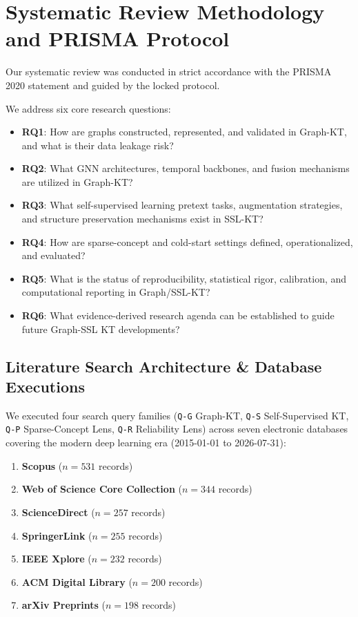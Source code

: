 ﻿\documentclass[10pt,journal,compsoc]{IEEEtran}
\begin{document}
\section{Systematic Review Methodology and PRISMA Protocol}
Our systematic review was conducted in strict accordance with the PRISMA 2020 statement and guided by the locked protocol.

We address six core research questions:
\begin{itemize}
    \item \textbf{RQ1}: How are graphs constructed, represented, and validated in Graph-KT, and what is their data leakage risk?
    \item \textbf{RQ2}: What GNN architectures, temporal backbones, and fusion mechanisms are utilized in Graph-KT?
    \item \textbf{RQ3}: What self-supervised learning pretext tasks, augmentation strategies, and structure preservation mechanisms exist in SSL-KT?
    \item \textbf{RQ4}: How are sparse-concept and cold-start settings defined, operationalized, and evaluated?
    \item \textbf{RQ5}: What is the status of reproducibility, statistical rigor, calibration, and computational reporting in Graph/SSL-KT?
    \item \textbf{RQ6}: What evidence-derived research agenda can be established to guide future Graph-SSL KT developments?
\end{itemize}

\subsection{Literature Search Architecture \& Database Executions}
We executed four search query families (\texttt{Q-G} Graph-KT, \texttt{Q-S} Self-Supervised KT, \texttt{Q-P} Sparse-Concept Lens, \texttt{Q-R} Reliability Lens) across seven electronic databases covering the modern deep learning era (2015-01-01 to 2026-07-31):
\begin{enumerate}
    \item \textbf{Scopus} ($n = 531$ records)
    \item \textbf{Web of Science Core Collection} ($n = 344$ records)
    \item \textbf{ScienceDirect} ($n = 257$ records)
    \item \textbf{SpringerLink} ($n = 255$ records)
    \item \textbf{IEEE Xplore} ($n = 232$ records)
    \item \textbf{ACM Digital Library} ($n = 200$ records)
    \item \textbf{arXiv Preprints} ($n = 198$ records)
\end{enumerate}
\end{document}
